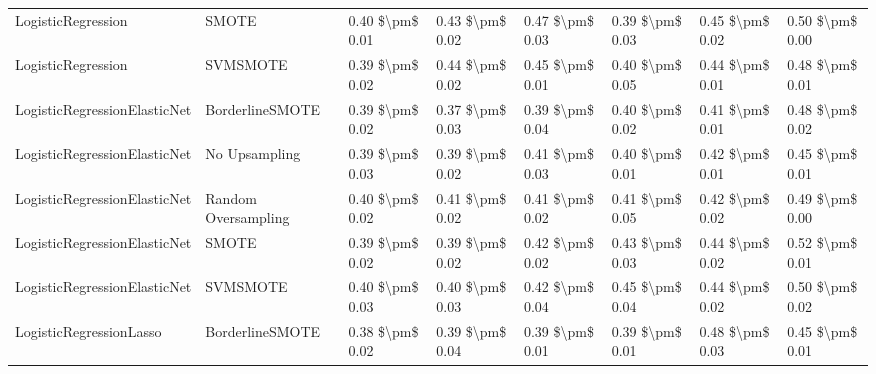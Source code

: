 \begin{tabular}{llllllll}
             LogisticRegression &                         SMOTE & 0.40 \$\textbackslash pm\$ 0.01 &           0.43 \$\textbackslash pm\$ 0.02 &       0.47 \$\textbackslash pm\$ 0.03 &        0.39 \$\textbackslash pm\$ 0.03 &                         0.45 \$\textbackslash pm\$ 0.02 &     0.50 \$\textbackslash pm\$ 0.00 \\
             LogisticRegression &                      SVMSMOTE & 0.39 \$\textbackslash pm\$ 0.02 &           0.44 \$\textbackslash pm\$ 0.02 &       0.45 \$\textbackslash pm\$ 0.01 &        0.40 \$\textbackslash pm\$ 0.05 &                         0.44 \$\textbackslash pm\$ 0.01 &     0.48 \$\textbackslash pm\$ 0.01 \\
   LogisticRegressionElasticNet &               BorderlineSMOTE & 0.39 \$\textbackslash pm\$ 0.02 &           0.37 \$\textbackslash pm\$ 0.03 &       0.39 \$\textbackslash pm\$ 0.04 &        0.40 \$\textbackslash pm\$ 0.02 &                         0.41 \$\textbackslash pm\$ 0.01 &     0.48 \$\textbackslash pm\$ 0.02 \\
   LogisticRegressionElasticNet &                 No Upsampling & 0.39 \$\textbackslash pm\$ 0.03 &           0.39 \$\textbackslash pm\$ 0.02 &       0.41 \$\textbackslash pm\$ 0.03 &        0.40 \$\textbackslash pm\$ 0.01 &                         0.42 \$\textbackslash pm\$ 0.01 &     0.45 \$\textbackslash pm\$ 0.01 \\
   LogisticRegressionElasticNet &           Random Oversampling & 0.40 \$\textbackslash pm\$ 0.02 &           0.41 \$\textbackslash pm\$ 0.02 &       0.41 \$\textbackslash pm\$ 0.02 &        0.41 \$\textbackslash pm\$ 0.05 &                         0.42 \$\textbackslash pm\$ 0.02 &     0.49 \$\textbackslash pm\$ 0.00 \\
   LogisticRegressionElasticNet &                         SMOTE & 0.39 \$\textbackslash pm\$ 0.02 &           0.39 \$\textbackslash pm\$ 0.02 &       0.42 \$\textbackslash pm\$ 0.02 &        0.43 \$\textbackslash pm\$ 0.03 &                         0.44 \$\textbackslash pm\$ 0.02 &     0.52 \$\textbackslash pm\$ 0.01 \\
   LogisticRegressionElasticNet &                      SVMSMOTE & 0.40 \$\textbackslash pm\$ 0.03 &           0.40 \$\textbackslash pm\$ 0.03 &       0.42 \$\textbackslash pm\$ 0.04 &        0.45 \$\textbackslash pm\$ 0.04 &                         0.44 \$\textbackslash pm\$ 0.02 &     0.50 \$\textbackslash pm\$ 0.02 \\
        LogisticRegressionLasso &               BorderlineSMOTE & 0.38 \$\textbackslash pm\$ 0.02 &           0.39 \$\textbackslash pm\$ 0.04 &       0.39 \$\textbackslash pm\$ 0.01 &        0.39 \$\textbackslash pm\$ 0.01 &                         0.48 \$\textbackslash pm\$ 0.03 &     0.45 \$\textbackslash pm\$ 0.01 \\

\end{tabular}
